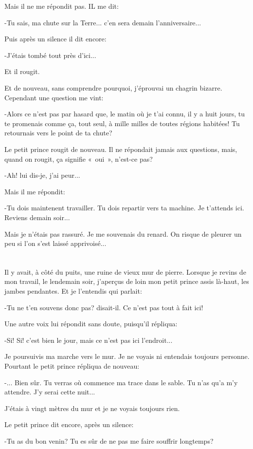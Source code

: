 \documentclass{report}
\newcommand{\parachapter}[2][]{\chapter[#1]{#2}}
\begin{document}
Mais il ne me répondit pas. IL me dit:

-Tu sais, ma chute sur la Terre... c'en sera demain l'anniversaire...

Puis après un silence il dit encore:

-J'étais tombé tout près d'ici...

Et il rougit.

Et de nouveau, sans comprendre pourquoi, j'éprouvai un chagrin bizarre. Cependant une question me vint:

-Alors ce n'est pas par hasard que, le matin où je t'ai connu, il y a huit jours, tu te promenais comme ça, tout seul, à mille milles de toutes régions habitées! Tu retournais vers le point de ta chute?

Le petit prince rougit de nouveau. Il ne répondait jamais aux questions, mais, quand on rougit, ça signifie «~oui~», n'est-ce pas?

-Ah! lui dis-je, j'ai peur...

Mais il me répondit:

-Tu dois maintenent travailler. Tu dois repartir vers ta machine. Je t'attends ici. Reviens demain soir...

Mais je n'étais pas rassuré. Je me souvenais du renard. On risque de pleurer un peu si l'on s'est laissé apprivoisé...

\parachapter{} %
Il y avait, à côté du puits, une ruine de vieux mur de pierre. Lorsque je revins de mon travail, le lendemain soir, j'aperçus de loin mon petit prince assis là-haut, les jambes pendantes. Et je l'entendis qui parlait:

-Tu ne t'en souvens donc pas? disait-il. Ce n'est pas tout à fait ici!

Une autre voix lui répondit sans doute, puisqu'il répliqua:

-Si! Si! c'est bien le jour, mais ce n'est pas ici l'endroit...

Je poursuivis ma marche vers le mur. Je ne voyais ni entendais toujours personne. Pourtant le petit prince répliqua de nouveau:

-... Bien sûr. Tu verras où commence ma trace dans le sable. Tu n'as qu'a m'y attendre. J'y serai cette nuit...

J'étais à vingt mètres du mur et je ne voyais toujours rien.

Le petit prince dit encore, après un silence:

-Tu as du bon venin? Tu es sûr de ne pas me faire souffrir longtemps?
\end{document}

